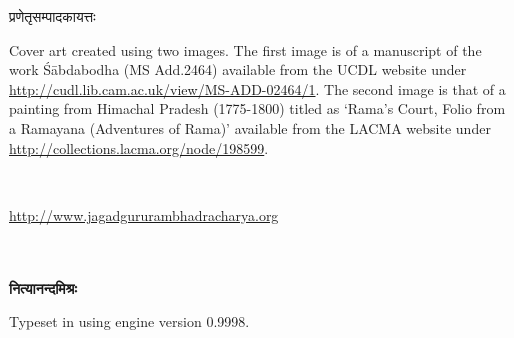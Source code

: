\documentclass[twoside]{book}
\makeatletter
\renewcommand*{\cleardoublepage}{\clearpage\if@twoside \ifodd\c@page\else
  \hbox{}
  \thispagestyle{empty}
  \newpage
  \if@twocolumn\hbox{}\newpage\fi\fi\fi}
\renewcommand\cftchapfont{\LARGE\bfseries}
\renewcommand\cftsecfont{\Large}
\makeatother
\begin{document}
\begin{titlepage}
{\fontsize{14}{21} \selectfont प्रणेतृसम्पादकायत्तः}\\[-4pt]
 \vfill
{\fontsize{14}{18} \selectfont \begin{sloppypar}\justifying\begin{english} \noindent Cover art created using two images. The first image is of a manuscript of the work Śābdabodha (MS Add.2464) available from the UCDL website under \href{http://cudl.lib.cam.ac.uk/view/MS-ADD-02464/1}{http://cudl.lib.cam.ac.uk/view/MS-ADD-02464/1}. The second image is that of a painting from Himachal Pradesh (1775-1800) titled as ‘Rama’s Court, Folio from a Ramayana (Adventures of Rama)’ available from the LACMA website under \href{http://collections.lacma.org/node/198599}{http://collections.lacma.org/node/198599}.\end{english}\end{sloppypar}}
 \vfill
\noindent {\fontsize{14}{21} \selectfont \textcolor{red}{पुस्तकप्राप्तिस्थानम्}}\\[-4pt]

{\fontsize{14}{21} \selectfont \begin{english}\href{http://www.jagadgururambhadracharya.org}{http://www.jagadgururambhadracharya.org}\end{english}}\\[-4pt]
 \vfill
\noindent {\fontsize{14}{21} \selectfont \textcolor{red}{अक्षरसंयोजकः}}\\[-4pt]

{\fontsize{14}{21} \selectfont \bfseries नित्यानन्दमिश्रः}\\[-6pt]

{\fontsize{12}{18} \selectfont \begin{english}Typeset in \XeLaTeX{} using \XeTeX{} engine version 0.9998.\end{english}}\\[-4pt]
\end{titlepage}
\titleformat{\section}[block]{\color{blue}\Large\bfseries\filright}{\color{blue}{\Large\thesection}}{0.25em}{}
\pagestyle{plain}
\frontmatter
{}
\renewcommand\cftchapfont{\LARGE}
\renewcommand\cftsecfont{\Large}
\renewcommand\cftsubsecfont{\large}
{\pagestyle{plain}
\renewcommand{\contentsname}{अनुक्रमणिका}
\begin{spacing}{1.6}
\tableofcontents
\end{spacing}
\cleardoublepage}
\end{document}
